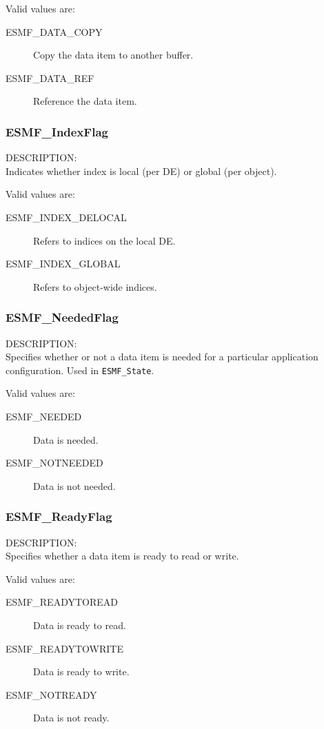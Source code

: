 Valid values are:
\begin{description}
\item [ESMF\_DATA\_COPY]
      Copy the data item to another buffer.
\item [ESMF\_DATA\_REF]
      Reference the data item.
\end{description}

\subsubsection{ESMF\_IndexFlag}
\label{opt:indexflag}
{\sf DESCRIPTION:\\}
Indicates whether index is local (per DE) or global (per object).

Valid values are:
\begin{description}
\item [ESMF\_INDEX\_DELOCAL]
      Refers to indices on the local DE.
\item [ESMF\_INDEX\_GLOBAL]
      Refers to object-wide indices.
\end{description}

\subsubsection{ESMF\_NeededFlag}
\label{opt:neededflag}
{\sf DESCRIPTION:\\}
Specifies whether or not a data item is needed for a 
particular application configuration.  Used in {\tt ESMF\_State}.

Valid values are:
\begin{description}
   \item [ESMF\_NEEDED] 
         Data is needed.
   \item [ESMF\_NOTNEEDED]
         Data is not needed.
\end{description}

\subsubsection{ESMF\_ReadyFlag}
\label{opt:readyflag}
{\sf DESCRIPTION:\\}
Specifies whether a data item is ready to read or write.

Valid values are:
\begin{description}
   \item [ESMF\_READYTOREAD] 
         Data is ready to read.
   \item [ESMF\_READYTOWRITE]
         Data is ready to write.
   \item [ESMF\_NOTREADY]
         Data is not ready.
\end{description}

